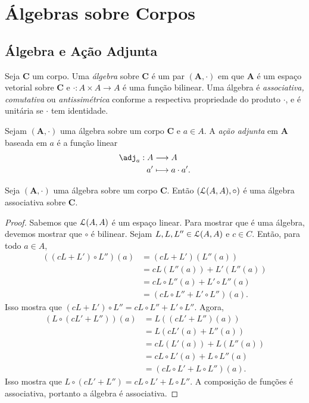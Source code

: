 \chapter{Álgebras sobre Corpos}

\section{Álgebra e Ação Adjunta}

\begin{defi}
Seja $\bm C$ um corpo. Uma \emph{álgebra} sobre $\bm C$ é um par $(\bm A,\cdot)$ em que $\bm A$ é um espaço vetorial sobre $\bm C$ e $\cdot\colon A \times A \to A$ é uma função bilinear. Uma álgebra é \emph{associativa, comutativa} ou \emph{antissimétrica} conforme a respectiva propriedade do produto $\cdot$, e é unitária se $\cdot$ tem identidade.
\end{defi}

\begin{defi}
Sejam $(\bm A,\cdot)$ uma álgebra sobre um corpo $\bm C$ e $a \in A$. A \emph{ação adjunta} em $\bm A$ baseada em $a$ é a função linear
	\begin{align*}
	\func{\adj_a}{A}{A}{a'}{a \cdot a'.}
	\end{align*}
\end{defi}

\begin{prop}
Seja $(\bm A,\cdot)$ uma álgebra sobre um corpo $\bm C$. Então $(\mathcal{L}(A,A),\circ)$ é uma álgebra associativa sobre $\bm C$.
\end{prop}
\begin{proof}
Sabemos que $\mathcal{L}(A,A)$ é um espaço linear. Para mostrar que é uma álgebra, devemos mostrar que $\circ$ é bilinear. Sejam $L,L,L'' \in \mathcal{L}(A,A)$ e $c \in C$. Então, para todo $a \in A$,
	\begin{align*}
	((cL+L') \circ L'')(a) &= (cL+L')(L''(a)) \\
		&= cL(L''(a))+L'(L''(a)) \\
		&= cL \circ L''(a) + L' \circ L''(a) \\
		&= (cL \circ L'' + L' \circ L'')(a).
	\end{align*}
Isso mostra que $(cL+L') \circ L'' = cL \circ L'' + L' \circ L''$. Agora,
	\begin{align*}
	(L \circ (cL'+L''))(a) &= L((cL'+L'')(a)) \\
		&= L(cL'(a)+L''(a)) \\
		&= cL(L'(a))+L(L''(a)) \\
		&= cL \circ L'(a)+L \circ L''(a) \\
		&= (cL \circ L' + L \circ L'')(a).
	\end{align*}
Isso mostra que $L \circ (cL'+L'') = cL \circ L' + L \circ L''$. A composição de funções é associativa, portanto a álgebra é associativa.
\end{proof}

